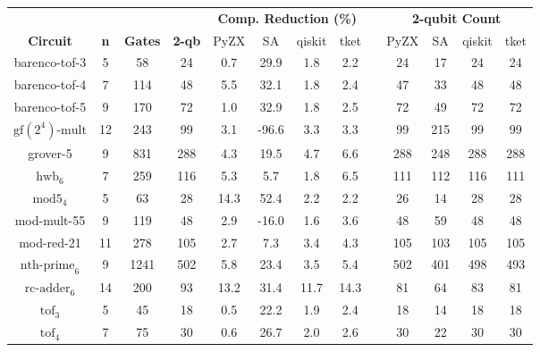 \begin{table}[t]
  \footnotesize
  \centering
\begin{tabular}{@{}ccccccccccccc@{}}
\toprule
 &
   &
   &
   &
  \multicolumn{4}{c}{\textbf{Comp. Reduction (\%)}} &
  \multicolumn{1}{l}{} &
  \multicolumn{4}{c}{\textbf{2-qubit Count}} \\ \cmidrule(lr){5-8} \cmidrule(l){10-13}
\textbf{Circuit} &
  \textbf{n} &
  \textbf{Gates} &
  \textbf{2-qb} &
PyZX &
  SA &
  qiskit &
  tket &
   &
  PyZX &
  SA &
  qiskit &
  tket \\ \midrule
barenco-tof-3                & 5  & 58   & 24  & 0.7  & 29.9  & 1.8  & 2.2  &  & 24  & 17  & 24  & 24  \\
barenco-tof-4                & 7  & 114  & 48  & 5.5  & 32.1  & 1.8  & 2.4  &  & 47  & 33  & 48  & 48  \\
barenco-tof-5                & 9  & 170  & 72  & 1.0  & 32.9  & 1.8  & 2.5  &  & 72  & 49  & 72  & 72  \\
$\text{gf}(2^4)\text{-mult}$ & 12 & 243  & 99  & 3.1  & -96.6 & 3.3  & 3.3  &  & 99  & 215 & 99  & 99  \\
grover-5                     & 9  & 831  & 288 & 4.3  & 19.5  & 4.7  & 6.6 &  & 288 & 248 & 288 & 288 \\
$\text{hwb}_6$               & 7  & 259  & 116 & 5.3  & 5.7   & 1.8  & 6.5  &  & 111 & 112 & 116 & 111 \\
$\text{mod5}_4$              & 5  & 63   & 28  & 14.3 & 52.4  & 2.2  & 2.2  &  & 26  & 14  & 28  & 28  \\
mod-mult-55                  & 9  & 119  & 48  & 2.9  & -16.0 & 1.6  & 3.6 &  & 48  & 59  & 48  & 48  \\
mod-red-21                   & 11 & 278  & 105 & 2.7  & 7.3   & 3.4  & 4.3 &  & 105 & 103 & 105 & 105 \\
$\text{nth-prime}_6$         & 9  & 1241 & 502 & 5.8  & 23.4  & 3.5  & 5.4  &  & 502 & 401 & 498 & 493 \\
$\text{rc-adder}_6$          & 14 & 200  & 93  & 13.2 & 31.4  & 11.7 & 14.3  &  & 81  & 64  & 83  & 81  \\
$\text{tof}_3$               & 5  & 45   & 18  & 0.5  & 22.2  & 1.9  & 2.4  &  & 18  & 14  & 18  & 18  \\
$\text{tof}_4$               & 7  & 75   & 30  & 0.6  & 26.7  & 2.0  & 2.6 &  & 30  & 22  & 30  & 30  \\

\end{tabular}
\end{table}
